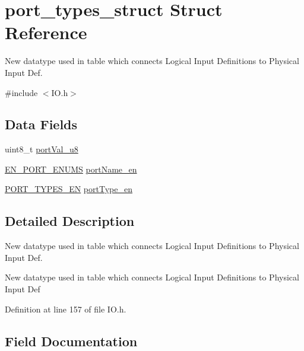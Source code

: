 \hypertarget{structport__types__struct}{}\section{port\+\_\+types\+\_\+struct Struct Reference}
\label{structport__types__struct}


New datatype used in table which connects Logical Input Definitions to Physical Input Def.  




{\ttfamily \#include $<$I\+O.\+h$>$}

\subsection*{Data Fields}
\begin{DoxyCompactItemize}
\item 
uint8\+\_\+t \hyperlink{structport__types__struct_a615d0b42ed9d6a5cdddaf76af96a1215}{port\+Val\+\_\+u8}
\item 
\hyperlink{_i_o_8h_a1a7bdb51679c629be889488f453ac268}{E\+N\+\_\+\+P\+O\+R\+T\+\_\+\+E\+N\+U\+M\+S} \hyperlink{structport__types__struct_a72057821dac134dc8a87b799141e7d91}{port\+Name\+\_\+en}
\item 
\hyperlink{_i_o_8h_aef5326c2f51b2d56b88ee83510957620}{P\+O\+R\+T\+\_\+\+T\+Y\+P\+E\+S\+\_\+\+E\+N} \hyperlink{structport__types__struct_a8e103fbfee17cee6bdb7a2831d4ba138}{port\+Type\+\_\+en}
\end{DoxyCompactItemize}


\subsection{Detailed Description}
New datatype used in table which connects Logical Input Definitions to Physical Input Def. 

New datatype used in table which connects Logical Input Definitions to Physical Input Def 

Definition at line 157 of file I\+O.\+h.



\subsection{Field Documentation}
\hypertarget{structport__types__struct_a72057821dac134dc8a87b799141e7d91}{}
